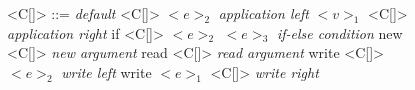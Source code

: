 \documentclass[11pt,oneside]{book}
\newcommand{\synlabel}[1]{\hfill \textit{#1}}
\begin{document}
\begin{figure}[!hp]
\begin{grammar}

    <C[\textbullet]> ::=  \textbullet                          \synlabel{default}
                     \alt <C[\textbullet]> $<e>_2$             \synlabel{application left}
                     \alt $<v>_1$ <C[\textbullet]>             \synlabel{application right}
                     \alt if <C[\textbullet]> $<e>_2$ $<e>_3$  \synlabel{if-else condition}
                     \alt new <C[\textbullet]>                 \synlabel{new argument}
                     \alt read <C[\textbullet]>                \synlabel{read argument}
                     \alt write <C[\textbullet]> $<e>_2$       \synlabel{write left}
                     \alt write $<e>_1$ <C[\textbullet]>       \synlabel{write right}

\end{grammar}

\end{figure}
\end{document}
